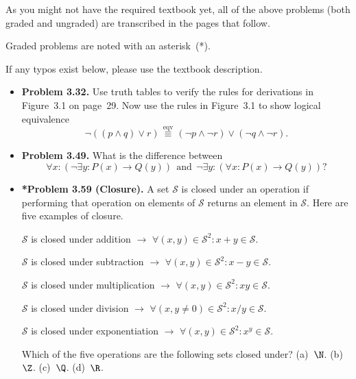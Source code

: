 \documentclass[11pt]{article}
\def\OR{\vee}
\def\AND{\wedge}
\def\imp{\rightarrow}
\begin{document}
As you might not have the required textbook yet,
all of the above problems (both graded and ungraded)
are transcribed in the pages that follow.

Graded problems are noted with an asterisk~(*).

If any typos exist below, please use the textbook description.

\newpage
\begin{itemize}

\item \textbf{Problem 3.32.}
  Use truth tables to verify the rules for derivations in Figure~3.1 on page~29.
  Now use the rules in Figure~3.1 to show logical equivalence
  $$\neg((p\AND q)\OR r)\overset{\text{eqv}}{\ \equiv\ }(\neg p\AND\neg r)\OR(\neg q\AND \neg r)\text{.}$$

\vspace{0.1in}

\item \textbf{Problem 3.49.}
  What is the difference between
  $$\forall x: (\neg\exists y: P(x)\imp Q(y))\ \ \text{and}\ \ \neg\exists y: (\forall x: P(x)\imp Q(y))\text{?}$$

\vspace{0.1in}

\item \textbf{*Problem 3.59 (Closure).}
  A set $\mathcal{S}$ is closed under an operation if performing that
  operation on elements of $\mathcal{S}$ returns an element in $\mathcal{S}$.
  Here are five examples of closure.

  \begin{center}
  $\mathcal{S}$ is closed under addition $\imp$
  $\forall(x,y)\in\mathcal{S}^2: x+y\in\mathcal{S}$.

  $\mathcal{S}$ is closed under subtraction $\imp$
  $\forall(x,y)\in\mathcal{S}^2: x-y\in\mathcal{S}$.

  $\mathcal{S}$ is closed under multiplication $\imp$
  $\forall(x,y)\in\mathcal{S}^2: xy\in\mathcal{S}$.

  $\mathcal{S}$ is closed under division $\imp$
  $\forall(x,y\ne 0)\in\mathcal{S}^2: x/y\in\mathcal{S}$.

  $\mathcal{S}$ is closed under exponentiation $\imp$
  $\forall(x,y)\in\mathcal{S}^2: x^y\in\mathcal{S}$.
  \end{center}

  Which of the five operations are the following sets closed under?
  (a)~$\N$.
  (b)~$\Z$.
  (c)~$\Q$.
  (d)~$\R$.


\end{itemize}
\end{document}
